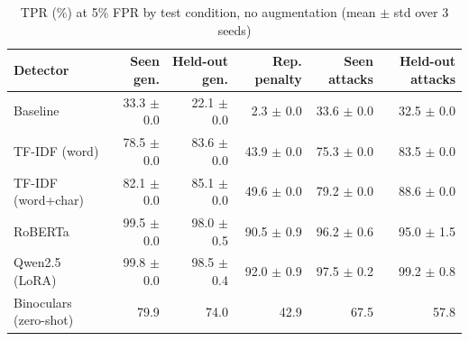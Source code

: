 \begin{table}[!t]
\centering
\caption{TPR (\%) at 5\% FPR by test condition, no augmentation (mean $\pm$ std over 3 seeds)}
\label{tab:main_tpr}
\footnotesize
\begin{tabular}{lrrrrr}
\toprule
\textbf{Detector} & \textbf{Seen gen.} & \textbf{Held-out gen.} & \textbf{Rep. penalty} & \textbf{Seen attacks} & \textbf{Held-out attacks} \\
\midrule
Baseline & 33.3 $\pm$ 0.0 & 22.1 $\pm$ 0.0 & 2.3 $\pm$ 0.0 & 33.6 $\pm$ 0.0 & 32.5 $\pm$ 0.0 \\
TF-IDF (word) & 78.5 $\pm$ 0.0 & 83.6 $\pm$ 0.0 & 43.9 $\pm$ 0.0 & 75.3 $\pm$ 0.0 & 83.5 $\pm$ 0.0 \\
TF-IDF (word+char) & 82.1 $\pm$ 0.0 & 85.1 $\pm$ 0.0 & 49.6 $\pm$ 0.0 & 79.2 $\pm$ 0.0 & 88.6 $\pm$ 0.0 \\
RoBERTa & 99.5 $\pm$ 0.0 & 98.0 $\pm$ 0.5 & 90.5 $\pm$ 0.9 & 96.2 $\pm$ 0.6 & 95.0 $\pm$ 1.5 \\
Qwen2.5 (LoRA) & 99.8 $\pm$ 0.0 & 98.5 $\pm$ 0.4 & 92.0 $\pm$ 0.9 & 97.5 $\pm$ 0.2 & 99.2 $\pm$ 0.8 \\
Binoculars (zero-shot) & 79.9 & 74.0 & 42.9 & 67.5 & 57.8 \\
\bottomrule
\end{tabular}
\end{table}
